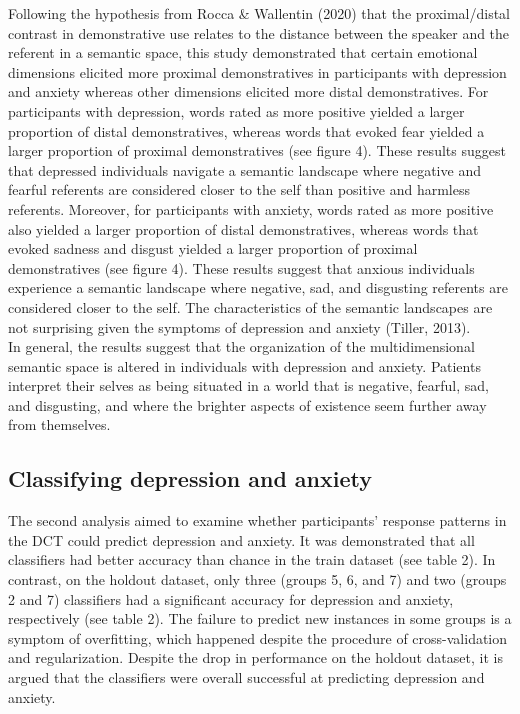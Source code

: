 \documentclass[11pt, a4paper]{article}
\begin{document}
Following the hypothesis from Rocca \& Wallentin (2020) that the proximal/distal contrast in demonstrative use relates to the distance between the speaker and the referent in a semantic space, this study demonstrated that certain emotional dimensions elicited more proximal demonstratives in participants with depression and anxiety whereas other dimensions elicited more distal demonstratives. For participants with depression, words rated as more positive yielded a larger proportion of distal demonstratives, whereas words that evoked fear yielded a larger proportion of proximal demonstratives (see figure 4). These results suggest that depressed individuals navigate a semantic landscape where negative and fearful referents are considered closer to the self than positive and harmless referents. Moreover, for participants with anxiety, words rated as more positive also yielded a larger proportion of distal demonstratives, whereas words that evoked sadness and disgust yielded a larger proportion of proximal demonstratives (see figure 4). These results suggest that anxious individuals experience a semantic landscape where negative, sad, and disgusting referents are considered closer to the self. The characteristics of the semantic landscapes are not surprising given the symptoms of depression and anxiety (Tiller, 2013). \\
In general, the results suggest that the organization of the multidimensional semantic space is altered in individuals with depression and anxiety. Patients interpret their selves as being situated in a world that is negative, fearful, sad, and disgusting, and where the brighter aspects of existence seem further away from themselves.   

\subsection{Classifying depression and anxiety}
The second analysis aimed to examine whether participants’ response patterns in the DCT could predict depression and anxiety. It was demonstrated that all classifiers had better accuracy than chance in the train dataset (see table 2). In contrast, on the holdout dataset, only three (groups 5, 6, and 7) and two (groups 2 and 7) classifiers had a significant accuracy for depression and anxiety, respectively (see table 2). The failure to predict new instances in some groups is a symptom of overfitting, which happened despite the procedure of cross-validation and regularization. Despite the drop in performance on the holdout dataset, it is argued that the classifiers were overall successful at predicting depression and anxiety. \\
\end{document}
